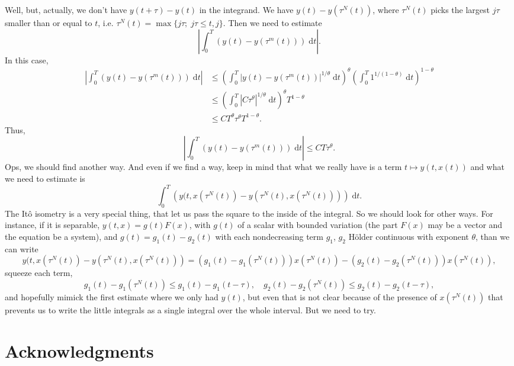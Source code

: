 \documentclass[reqno,12pt]{amsart}
\theoremstyle{plain}%
\theoremstyle{definition}
\newcommand{\dontshow}[1]{}
\begin{document}
Well, but, actually, we don't have $y(t+\tau) - y(t)$ in the integrand. We have $y(t) - y(\tau^N(t))$, where $\tau^N(t)$ picks the largest $j\tau$ smaller than or equal to $t$, i.e. $\tau^N(t) = \max\{j\tau; \; j\tau \leq t, j\}$.
Then we need to estimate
$$
\left|\int_0^T \left(y(t) - y(\tau^m(t)) \right) \;\mathrm{d}t \right|.
$$
In this case,
\begin{align*}
    \left|\int_0^T \left(y(t) - y(\tau^m(t)) \right) \;\mathrm{d}t \right| & \leq \left(\int_0^T \left|y(t) - y(\tau^m(t))\right|^{1/\theta} \;\mathrm{d}t \right)^\theta\left(\int_0^T 1^{1/(1-\theta)} \;\mathrm{d}t\right)^{1 - \theta} \\
    & \leq \left(\int_0^T \left|C\tau^\theta\right|^{1/\theta} \;\mathrm{d}t \right)^\theta T^{1 - \theta} \\
    & \leq CT^\theta \tau^\theta T^{1-\theta}.
\end{align*}
Thus,
\begin{equation}
    \left|\int_0^T \left(y(t) - y(\tau^m(t)) \right) \;\mathrm{d}t \right| \leq C T \tau^\theta.
\end{equation}
Ops, we should find another way. And even if we find a way, keep in mind that what we really have is a term $t \mapsto y(t, x(t))$ and what we need to estimate is
\[
    \int_0^T \left(y(t, x(\tau^N(t)) - y(\tau^N(t), x(\tau^N(t)))\right)\;\mathrm{d}t.
\]
The It\^o isometry is a very special thing, that let us pass the square to the inside of the integral. So we should look for other ways. For instance, if it is separable, $y(t, x) = g(t)F(x)$, with $g(t)$ of a scalar with bounded variation (the part $F(x)$ may be a vector and the equation be a system), and  $g(t) = g_1(t) - g_2(t)$ with each nondecreasing term $g_1$, $g_2$ H\"older continuous with exponent $\theta$, than we can write
$$
y(t, x(\tau^N(t)) - y(\tau^N(t), x(\tau^N(t))) = (g_1(t) - g_1(\tau^N(t)))x(\tau^N(t)) - (g_2(t) - g_2(\tau^N(t)))x(\tau^N(t)),
$$
squeeze each term,
$$
g_1(t) - g_1(\tau^N(t)) \leq g_1(t) - g_1(t - \tau), \quad g_2(t) - g_2(\tau^N(t)) \leq g_2(t) - g_2(t - \tau),
$$
and hopefully mimick the first estimate where we only had $y(t)$, but even that is not clear because of the presence of $x(\tau^N(t))$ that prevents us to write the little integrals as a single integral over the whole interval. But we need to try.

\dontshow{For the power function $t \mapsto t^\theta$, for $t \geq 0$, with $0<\theta\leq 1$, we have, for $t > s \geq 0$,
\begin{align*}
    \frac{|t^{\theta} - s^{\theta}|}{|t - s|^\theta} = \frac{\left|1 - \left(\frac{s}{t}\right)^\theta\right|}{\left|1 - \left(\frac{s}{t}\right)\right|^\theta} \leq \frac{\left|1 - \left(\frac{s}{t}\right)\right|}{\left|1 - \left(\frac{s}{t}\right)\right|} = 1,
\end{align*}
where we used that $(s/t)^\theta \geq (s/t)$, since $0 \leq s/t < 1$ and $0 < \theta \leq 1$, and, similarly, that $(1 - s/t)^\theta \geq (1 - s/t)$. This shows that $t \mapsto t^\theta$ is $\theta$-H\"older continuous with H\"older constant $1$.
}


\section*{Acknowledgments}


\begin{thebibliography}{25}


\end{thebibliography}
\end{document}
